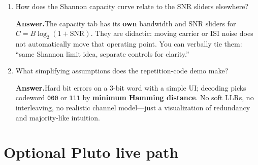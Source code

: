 \documentclass[11pt]{article}
\newenvironment{qaitem}{%
  \begin{enumerate}[label=\textbf{Q\arabic*.}, leftmargin=2.2em, itemsep=1.1em, listparindent=0pt]
}{%
  \end{enumerate}%
}
\newcommand{\Ans}{\par\noindent\textbf{Answer.}\quad}
\begin{document}
\begin{qaitem}
  \item How does the Shannon capacity curve relate to the SNR sliders elsewhere?
  \Ans The capacity tab has its \textbf{own} bandwidth and SNR sliders for $C=B\log_2(1+\mathrm{SNR})$. They are didactic: moving carrier or ISI noise does not automatically move that operating point. You can verbally tie them: ``same Shannon limit idea, separate controls for clarity.''

  \item What simplifying assumptions does the repetition-code demo make?
  \Ans Hard bit errors on a 3-bit word with a simple UI; decoding picks codeword \texttt{000} or \texttt{111} by \textbf{minimum Hamming distance}. No soft LLRs, no interleaving, no realistic channel model---just a visualization of redundancy and majority-like intuition.
\end{qaitem}

\section*{Optional Pluto live path}
\end{document}
